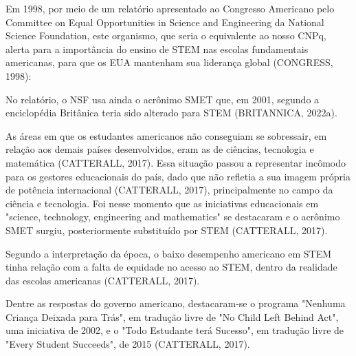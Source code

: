Em 1998, por meio de um relatório apresentado ao Congresso Americano pelo Committee on Equal Opportunities in Science and Engineering da National Science Foundation, este organismo, que seria o equivalente ao nosso CNPq, alerta para a importância do ensino de STEM nas escolas fundamentais americanas, para que os EUA mantenham sua liderança global  (CONGRESS, 1998):


\noindent\begin{center}\mbox{\centering{}}\end{center}


No relatório, o NSF usa ainda o acrônimo SMET que, em 2001, segundo a enciclopédia Britânica teria sido alterado para STEM (BRITANNICA, 2022a).

As áreas em que os estudantes americanos não conseguiam se sobressair, em relação aos demais países desenvolvidos, eram as de ciências, tecnologia e matemática  (CATTERALL, 2017). Essa situação passou a representar incômodo para os gestores educacionais do país, dado que não refletia a sua imagem própria de potência internacional  (CATTERALL, 2017), principalmente no campo da ciência e tecnologia. Foi nesse momento que as iniciativas educacionais em "science, technology, engineering and mathematics" se destacaram e o acrônimo SMET surgiu, posteriormente substituído por STEM  (CATTERALL, 2017).

Segundo a interpretação da época, o baixo desempenho americano em STEM tinha relação com a falta de equidade no acesso ao STEM, dentro da realidade das escolas americanas  (CATTERALL, 2017).

Dentre as respostas do governo americano, destacaram-se o programa "Nenhuma Criança Deixada para Trás", em tradução livre de "No Child Left Behind Act", uma iniciativa de 2002, e o "Todo Estudante terá Sucesso", em tradução livre de "Every Student Succeeds", de 2015  (CATTERALL, 2017).

